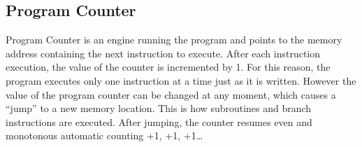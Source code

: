 
\subsection{Program Counter}
Program Counter is an engine running the program and points to the memory address containing the next instruction to execute. After each instruction execution, the value of the counter is incremented by 1. For this reason, the program executes only one instruction at a time just as it is written. However the value of the program counter can be changed at any moment, which causes a “jump” to a new memory location. This is how subroutines and branch instructions are executed. After jumping, the counter resumes even and monotonous automatic counting +1, +1, +1…



